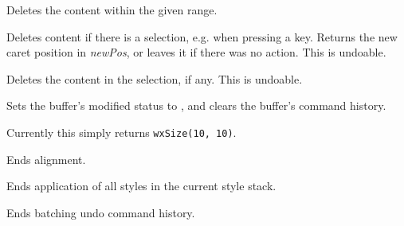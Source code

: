 \label{wxrichtextctrldelete}


Deletes the content within the given range.

\label{wxrichtextctrldeleteselectedcontent}


Deletes content if there is a selection, e.g. when pressing a key.
Returns the new caret position in {\it newPos}, or leaves it if there
was no action. This is undoable.

\label{wxrichtextctrldeleteselection}


Deletes the content in the selection, if any. This is undoable.

\label{wxrichtextctrldiscardedits}


Sets the buffer's modified status to \false, and clears the buffer's command history.

\label{wxrichtextctrldogetbestsize}


Currently this simply returns {\tt wxSize(10, 10)}.

\label{wxrichtextctrlendalignment}


Ends alignment.

\label{wxrichtextctrlendallstyles}


Ends application of all styles in the current style stack.

\label{wxrichtextctrlendbatchundo}


Ends batching undo command history.

\label{wxrichtextctrlendbold}

